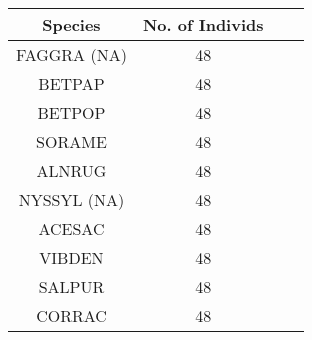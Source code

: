 \documentclass{article}\usepackage[]{graphicx}\usepackage[]{color}
\begin{document}
\newpage
\begin{center}
\label{tab:exp1} 
\footnotesize
\begin{tabular}{|c | c | c | c |}
\hline
\textbf{Species} & \textbf{No. of Individs} \\
\hline
FAGGRA (NA) & 48  \\
\hline
BETPAP & 48 \\
\hline
BETPOP & 48 \\
\hline
SORAME & 48 \\
\hline
ALNRUG & 48 \\
\hline
NYSSYL (NA) & 48 \\
\hline
ACESAC & 48 \\
\hline
VIBDEN & 48 \\
\hline
SALPUR & 48 \\
\hline
CORRAC & 48 \\
\hline
\end{tabular}
\end{center}
\end{document}
